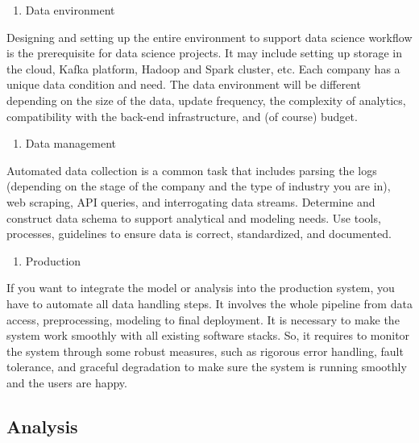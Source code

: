 \documentclass[
  12pt,
]{krantz}
\providecommand{\tightlist}{%
  \setlength{\itemsep}{0pt}\setlength{\parskip}{0pt}}
\begin{document}
\begin{enumerate}
\def\labelenumi{(\arabic{enumi})}
\tightlist
\item
  Data environment
\end{enumerate}

Designing and setting up the entire environment to support data science workflow is the prerequisite for data science projects. It may include setting up storage in the cloud, Kafka  platform, Hadoop  and Spark  cluster, etc. Each company has a unique data condition and need. The data environment will be different depending on the size of the data, update frequency, the complexity of analytics, compatibility with the back-end infrastructure, and (of course) budget.

\begin{enumerate}
\def\labelenumi{(\arabic{enumi})}
\setcounter{enumi}{1}
\tightlist
\item
  Data management
\end{enumerate}

Automated data collection is a common task that includes parsing the logs (depending on the stage of the company and the type of industry you are in), web scraping, API queries, and interrogating data streams. Determine and construct data schema to support analytical and modeling needs. Use tools, processes, guidelines to ensure data is correct, standardized, and documented.

\begin{enumerate}
\def\labelenumi{(\arabic{enumi})}
\setcounter{enumi}{2}
\tightlist
\item
  Production
\end{enumerate}

If you want to integrate the model or analysis into the production system, you have to automate all data handling steps. It involves the whole pipeline from data access, preprocessing, modeling to final deployment. It is necessary to make the system work smoothly with all existing software stacks. So, it requires to monitor the system through some robust measures, such as rigorous error handling, fault tolerance, and graceful degradation to make sure the system is running smoothly and the users are happy.

\hypertarget{analysis}{%
\subsection{Analysis}\label{analysis}}
\end{document}
